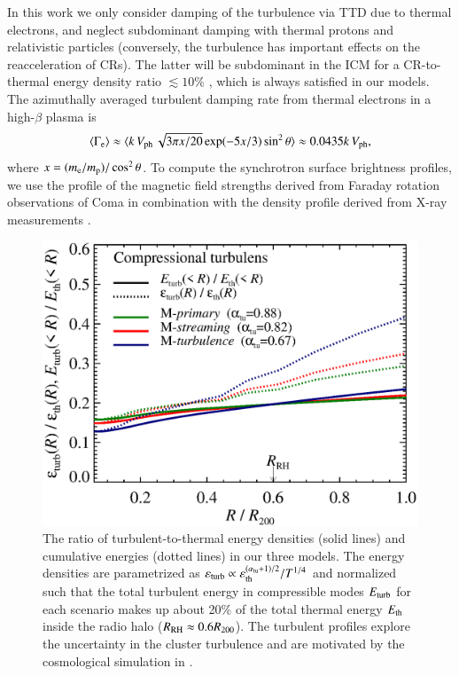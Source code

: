 \documentclass[fleqn,usenatbib,useAMS]{mnras}
\newcommand{\Vph}{V_\mathrm{ph}}
\newcommand{\eps}{\varepsilon}
\begin{document}
In this work we only consider damping of the turbulence via TTD due to
thermal electrons, and neglect subdominant damping with thermal
protons and relativistic particles (conversely, the turbulence has
important effects on the reacceleration of CRs). The latter will be
subdominant in the ICM for a CR-to-thermal energy density ratio
$\lesssim 10 \%$ \citep{brunetti07}, which is always satisfied in our
models. The azimuthally averaged turbulent damping rate from thermal
electrons \citep{brunetti07} in a high-$\beta$ plasma is
\begin{equation}
\label{eq:Gamma_e}
\langle\Gamma_{\rmn{e}}\rangle \approx \langle k\,\Vph\,\sqrt{3\upi
  x/20}\exp(-5x/3)\sin^2{\theta}\rangle\approx 0.0435k\,\Vph, 
\end{equation}
where $x=(m_{{\mathrm{e}}}/m_{{\mathrm{p}}})/\cos^2{\theta}$. To compute the
synchrotron surface brightness profiles, we use the profile of the
magnetic field strengths derived from Faraday rotation observations of
Coma \citep{bonafede10} in combination with the density profile
derived from X-ray measurements \citep{1992A&A...259L..31B}.

\begin{figure}
  \includegraphics[width=1.0\columnwidth]{turb_profile_ratio_tot.eps}
  \caption{The ratio of turbulent-to-thermal energy densities (solid
    lines) and cumulative energies (dotted lines) in our three
    models. The energy densities are parametrized as
    $\eps_\rmn{turb} \propto
    \eps_\rmn{th}^{(\alpha_{\rmn{tu}}+1)/2}/T^{1/4}$ and
    normalized such that the total turbulent energy in compressible
    modes $E_{\mathrm{turb}}$ for each scenario makes up about 20\% of the
    total thermal energy $E_{\mathrm{th}}$ inside the radio halo
    ($R_{\mathrm{RH}}\approx0.6R_{200}$). The turbulent profiles explore
    the uncertainty in the cluster turbulence and are motivated by the
    cosmological simulation in
    \citep{2009ApJ...705.1129L,2010ApJ...725.1452S,2011A&A...529A..17V}.}
  \label{fig:turb}
\end{figure}
\end{document}

